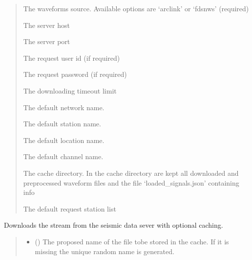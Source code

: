 \documentclass[letterpaper,10pt,english]{sphinxmanual}
\begin{document}
\begin{fulllineitems}
\sphinxAtStartPar
{}
\begin{quote}\begin{description}
\sphinxAtStartPar
The waveforms source. Available options are ‘arclink’ or ‘fdsnws’ (required)

\sphinxAtStartPar
The server host

\sphinxAtStartPar
The server port

\sphinxAtStartPar
The request user id (if required)

\sphinxAtStartPar
The request password (if required)

\sphinxAtStartPar
The downloading timeout limit

\sphinxAtStartPar
The default network name.

\sphinxAtStartPar
The default station name.

\sphinxAtStartPar
The default location name.

\sphinxAtStartPar
The default channel name.

\sphinxAtStartPar
The cache directory. In the cache directory are kept all downloaded and preprocessed waveform files
and the file ‘loaded\_signals.json’ containing info

\sphinxAtStartPar
The default request station list

\end{description}\end{quote}

\begin{fulllineitems}
\label{\detokenize{api_core:amw.core.signal_utils.StreamLoader.download}}
\pysigstartsignatures
{}
\pysigstopsignatures
\sphinxAtStartPar
Downloads the stream from the seismic data sever with optional caching.
\begin{quote}\begin{description}
\begin{itemize}
\item {} 
\sphinxAtStartPar
{} () \textendash{} The proposed name of the file tobe stored in the cache.
If it is missing the unique random name is generated.


\end{itemize}
\end{description}
\end{quote}
\end{fulllineitems}
\end{fulllineitems}
\end{document}
